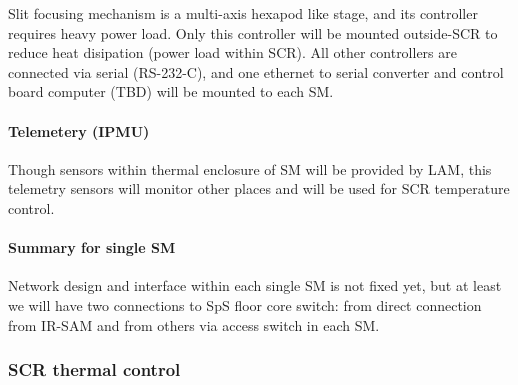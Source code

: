 \documentclass[a4paper,notitlepage]{article}
\begin{document}
Slit focusing mechanism is a multi-axis hexapod like stage, and its 
controller requires heavy power load. Only this controller will be mounted 
outside-SCR to reduce heat disipation (power load within SCR). 
All other controllers are connected via serial (RS-232-C), and one ethernet 
to serial converter and control board computer (TBD) 
will be mounted to each SM. 

\paragraph{Telemetery (IPMU)}

Though sensors within thermal enclosure of SM will be provided by LAM, 
this telemetry sensors will monitor other places and will be used for SCR 
temperature control. 

\paragraph{Summary for single SM}

Network design and interface within each single SM is not fixed yet, but 
at least we will have two connections to SpS floor core switch: 
from direct connection from IR-SAM and from others via access switch in 
each SM. 

%

\subsubsection{SCR thermal control}
\end{document}

